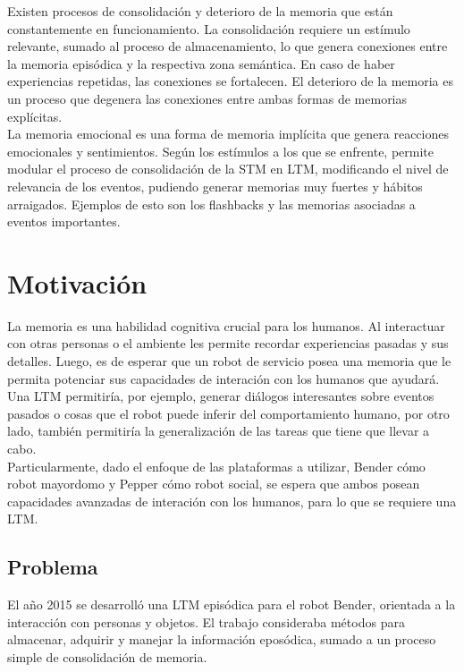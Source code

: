 \documentclass[12pt,letterpaper,spanish]{article}
\begin{document}
Existen procesos de consolidaci\'on y deterioro de la memoria que est\'an constantemente en funcionamiento. La consolidaci\'on requiere un est\'imulo relevante, sumado al proceso de almacenamiento, lo que genera conexiones entre la memoria epis\'odica y la respectiva zona sem\'antica. En caso de haber experiencias repetidas, las conexiones se fortalecen. El deterioro de la memoria es un proceso que degenera las conexiones entre ambas formas de memorias expl\'icitas.\\

La memoria emocional es una forma de memoria impl\'icita que genera reacciones emocionales y sentimientos. Seg\'un los est\'imulos a los que se enfrente, permite modular el proceso de consolidaci\'on de la STM en LTM, modificando el nivel de relevancia de los eventos, pudiendo generar memorias muy fuertes y h\'abitos arraigados. Ejemplos de esto son los flashbacks y las memorias asociadas a eventos importantes\cite{Eichenbaum:2008}.\\


\section{Motivaci\'on}

La memoria es una habilidad cognitiva crucial para los humanos. Al interactuar con otras personas o el ambiente les permite recordar experiencias pasadas y sus detalles. Luego, es de esperar que un robot de servicio posea una memoria que le permita potenciar sus capacidades de interaci\'on con los humanos que ayudar\'a\cite{Vijayakumar2014}. Una LTM permitir\'ia, por ejemplo, generar di\'alogos interesantes sobre eventos pasados o cosas que el robot puede inferir del comportamiento humano, por otro lado, tambi\'en permitir\'ia la generalizaci\'on de las tareas que tiene que llevar a cabo.\\

Particularmente, dado el enfoque de las plataformas a utilizar, Bender c\'omo robot mayordomo y Pepper c\'omo robot social, se espera que ambos posean capacidades avanzadas de interaci\'on con los humanos, para lo que se requiere una LTM.\\


\subsection{Problema}

El a\~no 2015 se desarroll\'o una LTM epis\'odica para el robot Bender, orientada a la interacci\'on con personas y objetos\cite{Sanchez:2015}. El trabajo consideraba m\'etodos para almacenar, adquirir y manejar la informaci\'on epos\'odica, sumado a un proceso simple de consolidaci\'on de memoria.\\
\end{document}
